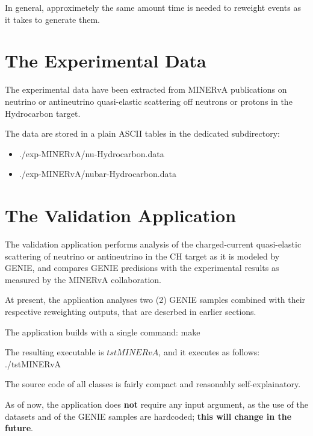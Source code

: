 In general, approximetely the same amount time is needed to reweight events as it takes to generate them.

\section{The Experimental Data}

The experimental data have been extracted from MINERvA publications\cite{minerva1} on neutrino or antineutrino 
quasi-elastic scattering off neutrons or protons in the Hydrocarbon target. 

The data are stored in a plain ASCII tables in the dedicated subdirectory:
\begin{itemize}
\item{./exp-MINERvA/nu-Hydrocarbon.data}
\item{./exp-MINERvA/nubar-Hydrocarbon.data}
\end{itemize}

\section{The Validation Application}

The validation application performs analysis of the charged-current quasi-elastic scattering of neutrino 
or antineutrino in the CH target as it is modeled by GENIE, and compares GENIE predisions with the
experimental results as measured by the MINERvA collaboration.

At present, the application analyses two (2) GENIE samples combined with their respective reweighting
outputs, that are descrbed in earlier sections.

The application builds with a single command:
make

The resulting executable is $tstMINERvA$, and it executes as follows:
./tstMINERvA

The source code of all classes is fairly compact and reasonably self-explainatory.

As of now, the application does {\bf not } require any input argument, as the use of the datasets and
of the GENIE samples are hardcoded; {\bf this will change in the future}.

